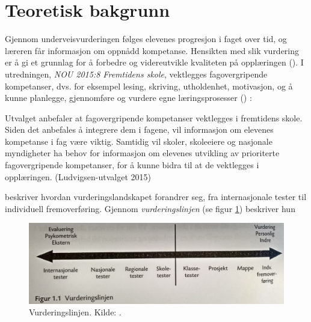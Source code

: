 \documentclass[main.tex]{subfiles}
\begin{document}
\section*{Teoretisk bakgrunn}
Gjennom underveisvurderingen følges elevenes progresjon i faget over tid, og læreren får informasjon
om oppnådd kompetanse. Hensikten med slik vurdering er å gi et grunnlag for å forbedre og videreutvikle  
kvaliteten på opplæringen (). I utredningen, \emph{NOU 2015:8 Fremtidens skole}, vektlegges
fagovergripende kompetanser, dvs. for eksempel lesing, skriving, utholdenhet, motivasjon, og å kunne planlegge, 
gjennomføre og vurdere egne læringsprosesser () :
\begin{displayquote}
Utvalget anbefaler at fagovergripende kompetanser vektlegges i fremtidens skole. Siden det  
anbefales å integrere dem i fagene, vil informasjon om elevenes kompetanse i fag være viktig.  
Samtidig vil skoler, skoleeiere og nasjonale myndigheter ha behov for informasjon om elevenes utvikling av 
prioriterte fagovergripende kompetanser, for å kunne bidra til at de vektlegges i opplæringen. 
(Ludvigsen-utvalget 2015)
\end{displayquote}
 beskriver hvordan vurderingslandskapet forandrer seg, fra internasjonale tester til
individuell fremoverføring. Gjennom \emph{vurderingslinjen} (se figur \ref{fig:smit09}) beskriver hun
\begin{figure}[h!]
\centering
\includegraphics[scale = 0.1]{../figures/vurderingslinjen.png}
\caption{Vurderingslinjen. Kilde: \protect{}.}
\label{fig:smit09}
\end{figure}
\end{document}
